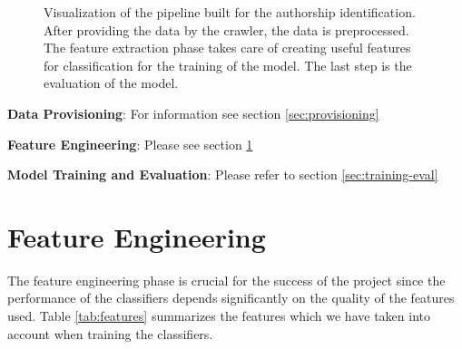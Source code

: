 \documentclass[journal, a4paper, 12pt]{IEEEtran}
\begin{document}
\begin{figure}[h]
	\caption{Visualization of the pipeline built for the authorship identification. After providing the data by the crawler, the data is
	 preprocessed. The feature extraction phase takes care of creating useful features for classification for the training of the model.
	The last step is the evaluation of the model.}
	\vspace*{5mm}
\end{figure}

\textbf{Data Provisioning}: For information see section \ref{sec:provisioning}

\textbf{Feature Engineering}: Please see section \ref{sec:features}

\textbf{Model Training and Evaluation}: Please refer to section \ref{sec:training-eval} 

\section{Feature Engineering}
\label{sec:features}

The feature engineering phase is crucial for the success of the project since the performance of the classifiers depends significantly on the quality of the features used. Table \ref{tab:features} summarizes the features which we have taken into account when training the classifiers.
\end{document}
